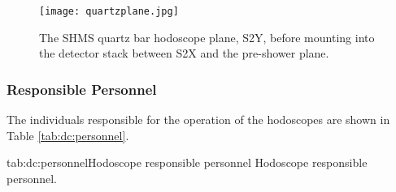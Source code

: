 {\begin{figure}
\begin{center}
  \texttt{[image: quartzplane.jpg]}
  \caption{\label{fig:quartzplane}The SHMS quartz bar hodoscope plane, S2Y,
before mounting into the detector stack between S2X and the pre-shower
plane.}
\end{center}
\end{figure}

\subsubsection{Responsible Personnel}

The individuals responsible for the operation
of the hodoscopes are shown in Table \ref{tab:dc:personnel}.

\begin{namestab}{tab:dc:personnel}{Hodoscope responsible personnel}{%
      Hodoscope responsible personnel.}
  \DaveMack{}
  \MahlonLong{}
  \SimonaMalace{}
\end{namestab}


}%
